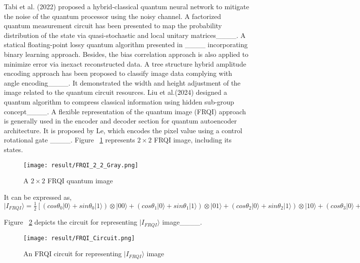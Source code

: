 Tabi et al. (2022)  proposed a hybrid-classical quantum neural network to mitigate the noise of the quantum processor using the noisy channel. A factorized quantum measurement circuit has been presented to map the probability distribution of the state via quasi-stochastic and local unitary matrices____. A statical floating-point lossy quantum algorithm presented in ____ incorporating binary learning approach. Besides, the bias correlation approach is also applied to minimize error via inexact reconstructed data. A tree structure hybrid amplitude encoding approach has been proposed to classify image data complying with angle encoding____. It demonstrated the width and height adjustment of the image related to the quantum circuit resources. Liu et al.(2024) designed a quantum algorithm to compress classical information using hidden sub-group concept____. A flexible representation of the quantum image (FRQI) approach is generally used in the encoder and decoder section for quantum autoencoder architecture. It is proposed by Le, which encodes the pixel value using a control rotational gate ____. Figure ~\ref{FRQI_A} represents $2\times2$ FRQI image, including its states. 
\begin{figure}[htbp]
\centerline{\texttt{[image: result/FRQI\_2\_2\_Gray.png]}}
\caption{A $2\times2$ FRQI quantum image}
\label{FRQI_A}
\end{figure}
It can be expressed as, \\

\begin{math}
|I_{FRQI}\rangle=\frac{1}{2}[\left(cos\theta_{0}|0\rangle +sin\theta_{0}|1\rangle \right) \otimes |00\rangle 
+\left(cos\theta_{1}|0\rangle+sin\theta_{1}|1\rangle \right)\otimes|01\rangle +  \left(cos\theta_{2}|0\rangle+sin\theta_{2}|1\rangle \right)\otimes|10\rangle+ \left(cos\theta_{3}|0\rangle+sin\theta_{3}|1\rangle \right)\otimes|11\rangle ]\nonumber
\end{math}

Figure ~\ref{FRQI_Circuit} depicts the circuit for representing   $|I_{FRQI}\rangle$ image____. 

\begin{figure}[t!]
\centerline{\texttt{[image: result/FRQI\_Circuit.png]}}
\caption{An FRQI circuit for representing $|I_{FRQI}\rangle$ image}
\label{FRQI_Circuit}
\end{figure}

